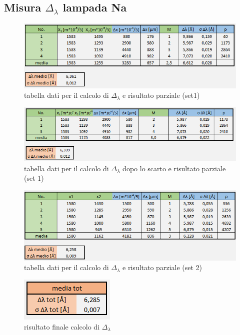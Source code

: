 \documentclass{article}
\begin{document}
\subsection{Misura $\Delta_\lambda$ lampada Na}

\begin{figure}[h!]
  \centering
  \includegraphics[width=0.75\linewidth]{IM tabella delta lambda set 1}
  \caption{tabella dati per il calcolo di $\Delta_\lambda$ e risultato parziale (set1)}
\end{figure}

\begin{figure}[h!]
  \centering
  \includegraphics[width=0.75\linewidth]{IM tabella delta lambda set 1 scarto}
  \caption{tabella dati per il calcolo di $\Delta_\lambda$ dopo lo scarto e risultato parziale (set 1)}
\end{figure}

\begin{figure}[h!]
  \centering
  \includegraphics[width=0.75\linewidth]{IM tabella delta lambda set 2}
  \caption{tabella dati per il calcolo di $\Delta_\lambda$ e risultato parziale (set 2)}
\end{figure}

\begin{figure}[h!]
  \centering
  \includegraphics[width=0.25\linewidth]{IM risultati delta lambda}
  \caption{risultato finale calcolo di $\Delta_\lambda$}
\end{figure}
\end{document}
